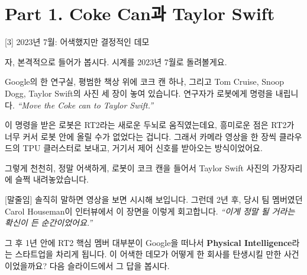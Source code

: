 \documentclass[aspectratio=169,10pt]{beamer}
\newenvironment{script}{%
  \footnotesize
  \setlength{\parskip}{0.5em}
  \setlength{\parindent}{0pt}
}{}
\begin{document}
\section{Part 1. Coke Can과 Taylor Swift}

\begin{frame}{[3] 2023년 7월: 어색했지만 결정적인 데모}
\begin{script}
자, 본격적으로 들어가 봅시다. 시계를 2023년 7월로 돌려볼게요.

Google의 한 연구실, 평범한 책상 위에 코크 캔 하나, 그리고 Tom Cruise, Snoop Dogg, Taylor Swift의 사진 세 장이 놓여 있습니다. 연구자가 로봇에게 명령을 내립니다. \textit{``Move the Coke can to Taylor Swift.''}

이 명령을 받은 로봇은 RT2라는 새로운 두뇌로 움직였는데요, 흥미로운 점은 RT2가 너무 커서 \alert{로봇 안에 올릴 수가 없었다}는 겁니다. 그래서 카메라 영상을 한 장씩 클라우드의 TPU 클러스터로 보내고, 거기서 제어 신호를 받아오는 방식이었어요.

그렇게 천천히, 정말 어색하게, 로봇이 코크 캔을 들어서 Taylor Swift 사진의 가장자리에 슬쩍 내려놓았습니다.

[말줄임] 솔직히 말하면 영상을 보면 시시해 보입니다. 그런데 2년 후, 당시 팀 멤버였던 Carol Houseman이 인터뷰에서 이 장면을 이렇게 회고합니다. \textit{``이게 정말 될 거라는 확신이 든 순간이었어요.''}

그 후 1년 안에 RT2 핵심 멤버 대부분이 Google을 떠나서 \textbf{Physical Intelligence}라는 스타트업을 차리게 됩니다. 이 어색한 데모가 어떻게 한 회사를 탄생시킬 만한 사건이었을까요? 다음 슬라이드에서 그 답을 봅시다.
\end{script}
\end{frame}
\end{document}

